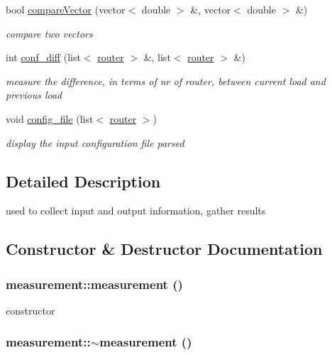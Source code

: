 \begin{DoxyCompactItemize}
bool \hyperlink{classmeasurement_abd3271afad2207cd5db4de16edbf59a3}{compareVector} (vector$<$ double $>$ \&, vector$<$ double $>$ \&)
\begin{DoxyCompactList}\small\item\em compare two vectors \item\end{DoxyCompactList}\item 
int \hyperlink{classmeasurement_a4126bd87377bb02f30d9f81f3d36304c}{conf\_\-diff} (list$<$ \hyperlink{classrouter}{router} $>$ \&, list$<$ \hyperlink{classrouter}{router} $>$ \&)
\begin{DoxyCompactList}\small\item\em measure the difference, in terms of nr of router, between current load and previous load \item\end{DoxyCompactList}\item 
void \hyperlink{classmeasurement_a10e7afbdd82e2fed30bd9e7a8725a3bc}{config\_\-file} (list$<$ \hyperlink{classrouter}{router} $>$)
\begin{DoxyCompactList}\small\item\em display the input configuration file parsed \item\end{DoxyCompactList}\end{DoxyCompactItemize}


\subsection{Detailed Description}
used to collect input and output information, gather results 

\subsection{Constructor \& Destructor Documentation}
\hypertarget{classmeasurement_a94ea175b4a5eecf4c60af94b7d630ca0}{
\subsubsection[{measurement}]{\setlength{\rightskip}{0pt plus 5cm}measurement::measurement ()}}
\label{classmeasurement_a94ea175b4a5eecf4c60af94b7d630ca0}


constructor 

\hypertarget{classmeasurement_adad6fad962fe7f356188e2d108069ab9}{
\subsubsection[{$\sim$measurement}]{\setlength{\rightskip}{0pt plus 5cm}measurement::$\sim$measurement ()}}
\label{classmeasurement_adad6fad962fe7f356188e2d108069ab9}


